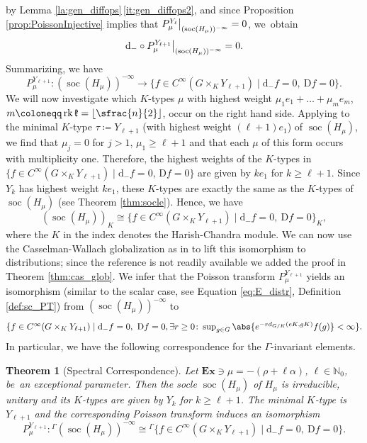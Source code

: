 \documentclass[JEP,XML,SOM,NoFloatCountersInSection,Unicode,published]{cedram}
\newcommand{\Ga}{{}^\Gamma\!}
\newtheorem{theorem}{Theorem}[section]
\theoremstyle{definition}
\DeclarePairedDelimiter{\abs}\lvert\rvert
\newcommand\restr[2]{{
\left.\kern-\nulldelimiterspace
#1
\vphantom{\big|}
\right|_{#2}
}}
\newcommand{\mf}[1]{\ensuremath{\mathfrak{#1}}}
\newcommand{\on}[1]{\ensuremath{\operatorname{#1}}}
\newcommand{\rhoa}{\ensuremath{\rho}}
\newcommand{\N}{\ensuremath{\mathbb{N}}}
\newcommand{\pst}[1]{\ensuremath{H_{#1}}}
\begin{document}
by Lemma \ref{la:gen_diffops}\,\eqref{it:gen_diffops2}, and since Proposition \ref{prop:PoissonInjective} implies that $\restr{P_\mu^{Y_\ell}}{(\on{soc}(\pst{\mu}))^{-\infty}}=0$, we~obtain
\[
\mathrm{d}_-\circ\restr{P_\mu^{Y_{\ell+1}}}{(\on{soc}(\pst{\mu}))^{-\infty}}=0.
\]
Summarizing, we have
\[
P_\mu^{Y_{\ell+1}}:(\on{soc}(\pst{\mu}))^{-\infty}\to\{f\in C^\infty(G\times_KY_{\ell+1})\mid\mathrm{d}_-f=0,\ \mathrm{D}f=0\}.
\]
We will now investigate which $K$-types $\mu$ with highest weight $\mu_1e_1+\ldots+\mu_me_m$, $m\coloneqq\on{rk}\mf k=\lfloor\sfrac{n}{2}\rfloor$, occur on the right hand side. Applying \cite[Th.\,6]{DGK88} to the minimal $K$-type $\tau\coloneqq Y_{\ell+1}$ (with highest weight $(\ell+1)e_1$) of $\on{soc}(\pst{\mu})$, we find that $\mu_j=0$ for $j>1$, $\mu_1\geq\ell+1$ and that each $\mu$ of this form occurs with multiplicity one. Therefore, the highest weights of the $K$-types in $\{f\in C^\infty(G\times_KY_{\ell+1})\mid\mathrm{d}_-f=0$, $\mathrm{D}f=0\}$ are given by $ke_1$ for $k\geq\ell+1$. Since $Y_k$ has highest weight $ke_1$, these $K$-types are exactly the same as the $K$-types of $\on{soc}(\pst{\mu})$ (see Theorem \ref{thm:socle}). Hence, we have
\[
(\on{soc}(\pst{\mu}))_K\cong\{f\in C^\infty(G\times_KY_{\ell+1})\mid\mathrm{d}_-f=0,\ \mathrm{D}f=0\}_K,
\]
where the $K$ in the index denotes the Harish-Chandra module. We can now use the Casselman-Wallach globalization as in \cite[Satz 4.13]{Ol} to lift this isomorphism to distributions; since the reference is not readily available we added the proof in Theorem \ref{thm:cas_glob}. We infer that the Poisson transform $P_\mu^{Y_{\ell+1}}$ yields an isomorphism (similar to the scalar case, see Equation \eqref{eq:E_distr}, Definition \ref{def:sc_PT}) from $(\on{soc}(\pst{\mu}))^{-\infty}$ to
\[\textstyle
\{f\in C^\infty(G\times_KY_{\ell+1})\mid\mathrm{d}_-f=0,\ \mathrm{D}f=0,\exists r\geq0\colon \sup_{g\in G}\abs{e^{-rd_{G/K}(eK,gK)}f(g)}<\infty\}.
\]
In particular, we have the following correspondence for the $\Gamma$-invariant elements.
\begin{theorem}[Spectral Correspondence]\label{thm:spectral_corres_SOn}
Let $\mathbf{Ex}\ni\mu=-(\rhoa+\ell\alpha)$, $\ell\in\N_0$, be~an exceptional parameter. Then the socle $\on{soc}(\pst{\mu})$ of $\pst{\mu}$ is irreducible, unitary and its $K$\nobreakdash-types are given by $Y_k$ for $k\geq\ell+1$. The minimal $K$-type is $Y_{\ell+1}$ and the corresponding Poisson transform induces an isomorphism
\[
P_\mu^{Y_{\ell+1}}\colon\Ga(\on{soc}(\pst{\mu}))^{-\infty}\cong\Ga\{f\in C^\infty(G\times_KY_{\ell+1})\mid\mathrm{d}_-f=0,\ \mathrm{D}f=0\}.
\]
\end{theorem}
\end{document}
